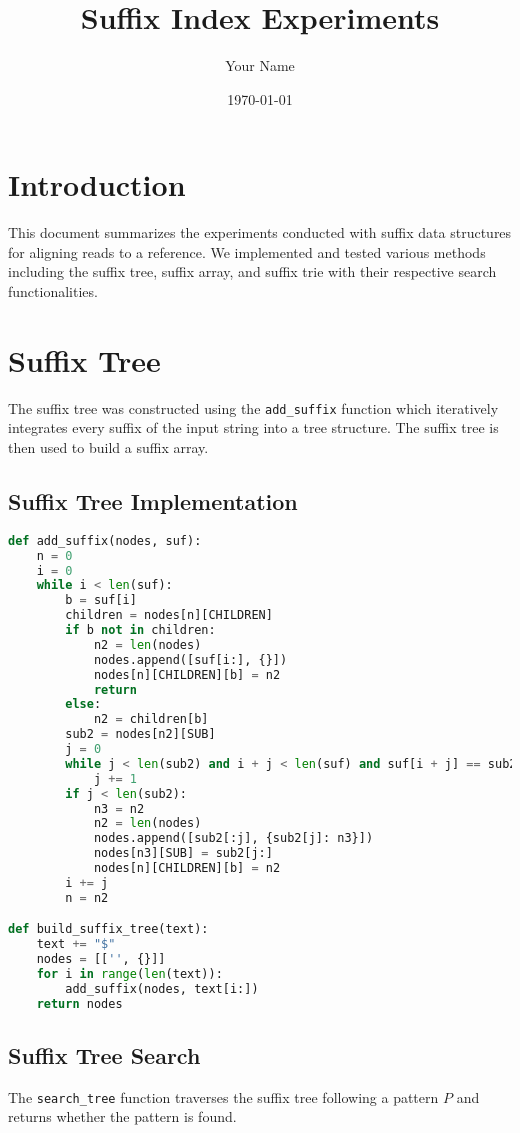 \documentclass{article}
\title{Suffix Index Experiments}
\author{Your Name}
\date{\today}
\begin{document}
\maketitle

\section{Introduction}
This document summarizes the experiments conducted with suffix data structures for aligning reads to a reference. We implemented and tested various methods including the suffix tree, suffix array, and suffix trie with their respective search functionalities.

\section{Suffix Tree}
The suffix tree was constructed using the \texttt{add\_suffix} function which iteratively integrates every suffix of the input string into a tree structure. The suffix tree is then used to build a suffix array.

\subsection{Suffix Tree Implementation}
\begin{lstlisting}[language=Python, caption=add_suffix and build_suffix_tree]
def add_suffix(nodes, suf):
    n = 0
    i = 0
    while i < len(suf):
        b = suf[i]
        children = nodes[n][CHILDREN]
        if b not in children:
            n2 = len(nodes)
            nodes.append([suf[i:], {}])
            nodes[n][CHILDREN][b] = n2
            return
        else:
            n2 = children[b]
        sub2 = nodes[n2][SUB]
        j = 0
        while j < len(sub2) and i + j < len(suf) and suf[i + j] == sub2[j]:
            j += 1
        if j < len(sub2):
            n3 = n2
            n2 = len(nodes)
            nodes.append([sub2[:j], {sub2[j]: n3}])
            nodes[n3][SUB] = sub2[j:]
            nodes[n][CHILDREN][b] = n2
        i += j
        n = n2

def build_suffix_tree(text):
    text += "$"
    nodes = [['', {}]]
    for i in range(len(text)):
        add_suffix(nodes, text[i:])
    return nodes
\end{lstlisting}

\subsection{Suffix Tree Search}
The \texttt{search\_tree} function traverses the suffix tree following a pattern \( P \) and returns whether the pattern is found.
\end{document}
